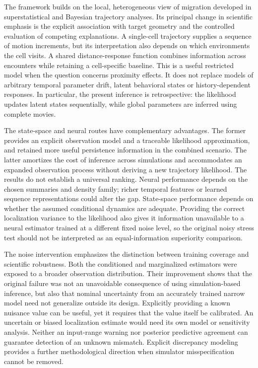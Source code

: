 \documentclass[12pt]{article}
\begin{document}
The framework builds on the local, heterogeneous view of migration developed in superstatistical and Bayesian trajectory analyses\citep{metzner2015,mark2018}. Its principal change in scientific emphasis is the explicit association with target geometry and the controlled evaluation of competing explanations. A single-cell trajectory supplies a sequence of motion increments, but its interpretation also depends on which environments the cell visits. A shared distance-response function combines information across encounters while retaining a cell-specific baseline. This is a useful restricted model when the question concerns proximity effects. It does not replace models of arbitrary temporal parameter drift, latent behavioral states or history-dependent responses. In particular, the present inference is retrospective: the likelihood updates latent states sequentially, while global parameters are inferred using complete movies.

The state-space and neural routes have complementary advantages. The former provides an explicit observation model and a traceable likelihood approximation, and retained more useful persistence information in the combined scenario. The latter amortizes the cost of inference across simulations and accommodates an expanded observation process without deriving a new trajectory likelihood. The results do not establish a universal ranking. Neural performance depends on the chosen summaries and density family; richer temporal features or learned sequence representations could alter the gap. State-space performance depends on whether the assumed conditional dynamics are adequate. Providing the correct localization variance to the likelihood also gives it information unavailable to a neural estimator trained at a different fixed noise level, so the original noisy stress test should not be interpreted as an equal-information superiority comparison.

The noise intervention emphasizes the distinction between training coverage and scientific robustness. Both the conditioned and marginalized estimators were exposed to a broader observation distribution. Their improvement shows that the original failure was not an unavoidable consequence of using simulation-based inference, but also that nominal uncertainty from an accurately trained narrow model need not generalize outside its design. Explicitly providing a known nuisance value can be useful, yet it requires that the value itself be calibrated. An uncertain or biased localization estimate would need its own model or sensitivity analysis. Neither an input-range warning nor posterior predictive agreement can guarantee detection of an unknown mismatch. Explicit discrepancy modeling provides a further methodological direction when simulator misspecification cannot be removed\citep{ward2022}.
\end{document}
